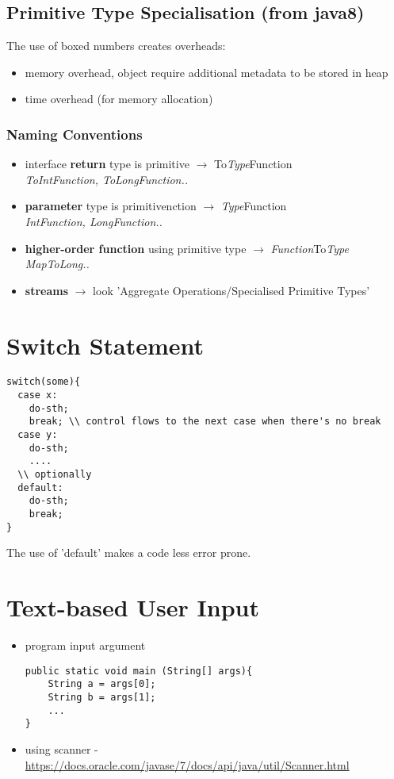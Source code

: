 \documentclass{report}
\begin{document}
\subsection{Primitive Type Specialisation (from java8)}
The use of boxed numbers creates overheads:
\begin{itemize}
	\item memory overhead, object require additional metadata to be stored in heap
	\item time overhead (for memory allocation)
\end{itemize}

\subsubsection*{Naming Conventions}
\begin{itemize}
	\item interface \textbf{return} type is primitive $\rightarrow$ To\textit{Type}Function\\
	\textit{ToIntFunction, ToLongFunction..}
	\item \textbf{parameter} type is primitivenction $\rightarrow$ \textit{Type}Function\\
	\textit{IntFunction, LongFunction..}
	\item \textbf{higher-order function} using primitive type $\rightarrow$ \textit{Function}To\textit{Type}\\
	\textit{MapToLong..}
	\item \textbf{streams} $\rightarrow$ look 'Aggregate Operations/Specialised Primitive Types'
\end{itemize}

\section{Switch Statement}
\begin{verbatim}
switch(some){
  case x:
    do-sth;
    break; \\ control flows to the next case when there's no break 
  case y:
    do-sth;
    ....
  \\ optionally
  default:
    do-sth;
    break;
}
\end{verbatim}
The use of 'default' makes a code less error prone.

\section{Text-based User Input}
\begin{itemize}
\item program input argument
\begin{verbatim}
public static void main (String[] args){
	String a = args[0];
    String b = args[1];
    ...
}
\end{verbatim}
\item using scanner - \url{https://docs.oracle.com/javase/7/docs/api/java/util/Scanner.html}
\end{itemize}
\end{document}
